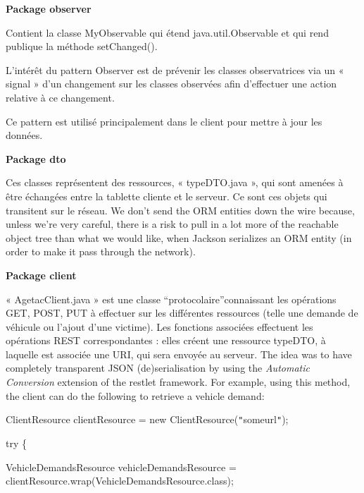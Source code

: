 \documentclass{article}
\begin{document}
\vspace{13pt}
{\color{color01} \textbf{Package observer}}

{\color{color01} Contient la classe MyObservable qui étend java.util.Observable 
et qui rend publique la méthode setChanged().}

{\color{color01} L'intérêt du pattern Observer est de prévenir les classes observatrices 
via un « signal » d'un changement sur les classes observées afin d'effectuer 
une action relative à ce changement.}

{\color{color01} Ce pattern est utilisé principalement dans le client pour mettre 
à jour les données.}

\vspace{13pt}
{\color{color01} \textbf{Package dto}}

{\color{color01} Ces classes représentent des ressources, « typeDTO.java », 
qui sont amenées à être échangées entre la tablette cliente et le serveur. 
Ce sont ces objets qui transitent sur le réseau. We don't send the ORM entities 
down the wire because, unless we're very careful, there is a risk to pull in a 
lot more of the reachable object tree than what we would like, when Jackson serializes 
an ORM entity (in order to make it pass through the network).}

\vspace{13pt}
{\color{color01} \textbf{Package client}}

{\color{color01} « AgetacClient.java » est une classe ``protocolaire''connaissant 
les opérations GET, POST, PUT à effectuer sur les différentes ressources (telle 
une demande de véhicule ou l'ajout d'une victime). Les fonctions associées effectuent 
les opérations REST correspondantes : elles créent une ressource typeDTO, à 
laquelle est associée une URI, qui sera envoyée au serveur. The idea was to have 
completely transparent JSON (de)serialisation by using the }{\color{color01} \textit{Automatic 
Conversion}}{\color{color01}  extension of the restlet framework. For example, 
using this method, the client can do the following to retrieve a vehicle demand:}

\vspace{13pt}
{\color{color01} ClientResource clientResource = new ClientResource(\texttt{"}someurl\texttt{"});}

{\color{color01} try \{}

{\color{color01} VehicleDemandsResource vehicleDemandsResource = clientResource.wrap(VehicleDemandsResource.class);}
\end{document}
